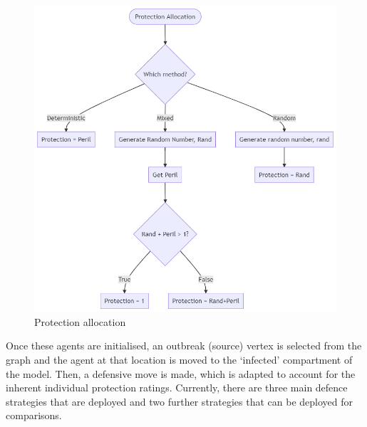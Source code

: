 \documentclass[../report.tex]{subfiles}
\begin{document}
\begin{figure}[ht]
  \centering
  \includegraphics[scale=0.4]{assets/protection}
  \caption{Protection allocation}
  \label{fig:protection}
\end{figure}

Once these agents are initialised, an outbreak (source) vertex is selected from the graph and the agent at that location is moved to the `infected' compartment of the model. Then, a defensive move is made, which is adapted to account for the inherent individual protection ratings. Currently, there are three main defence strategies that are deployed and two further strategies that can be deployed for comparisons.
\end{document}

